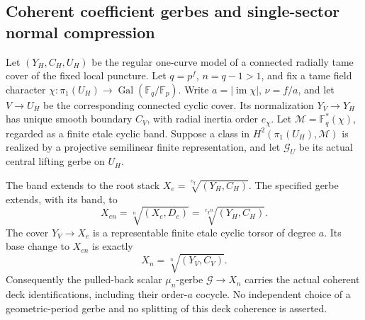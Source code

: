 \subsection{Coherent coefficient gerbes and single-sector normal compression}

\begin{lemma}
\label{D:coherent-full-root-coefficient-gerbe}
Let $(Y_H,C_H,U_H)$ be the regular one-curve model of a
connected radially tame cover of the fixed local puncture.
Let $q=p^f$, $n=q-1>1$, and fix a tame field character
$\chi:\pi_1(U_H)\to\operatorname{Gal}(\mathbb F_q/\mathbb F_p)$.
Write $a=|\operatorname{im}\chi|$, $\nu=f/a$, and let
$V\to U_H$ be the corresponding connected cyclic cover.
Its normalization $Y_V\to Y_H$ has unique smooth boundary
$C_V$, with radial inertia order $e_\chi$.
Let $\mathcal M=\mathbb F_q^*(\chi)$, regarded as a finite
etale cyclic band. Suppose a class in
$H^2(\pi_1(U_H),\mathcal M)$ is realized by a projective
semilinear finite representation, and let $\mathscr G_U$
be its actual central lifting gerbe on $U_H$.

The band extends to the root stack
$X_e=\sqrt[e_\chi]{(Y_H,C_H)}$. The specified gerbe extends,
with its band, to
\[
 X_{en}=\sqrt[n]{(X_e,D_e)}
                  =\sqrt[e_\chi n]{(Y_H,C_H)}.          \tag{D.SC.1}
\]
The cover $Y_V\to X_e$ is a representable finite etale
cyclic torsor of degree $a$. Its base change to $X_{en}$
is exactly
\[
                    X_n=\sqrt[n]{(Y_V,C_V)}.            \tag{D.SC.2}
\]
Consequently the pulled-back scalar $\mu_n$-gerbe
$\mathscr G\to X_n$ carries the actual coherent deck
identifications, including their order-$a$ cocycle.
No independent choice of a geometric-period gerbe and
no splitting of this deck coherence is asserted.
\end{lemma}

